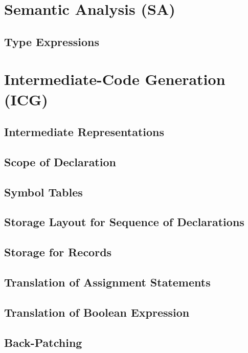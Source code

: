 \chapter{Semantic Analysis (SA)}

\section{Type Expressions}

\chapter{Intermediate-Code Generation (ICG)}
\section{Intermediate Representations}

\section{Scope of Declaration}

\section{Symbol Tables}

\section{Storage Layout for Sequence of Declarations}

\section{Storage for Records}

\section{Translation of Assignment Statements}

\section{Translation of Boolean Expression}

\section{Back-Patching}